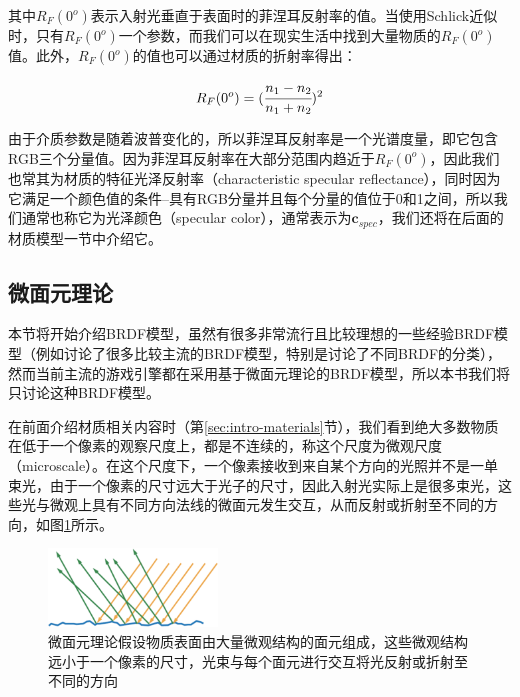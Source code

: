 其中$R_F(0^o)$表示入射光垂直于表面时的菲涅耳反射率的值。当使用Schlick近似时，只有$R_F(0^o)$一个参数，而我们可以在现实生活中找到大量物质的$R_F(0^o)$值。此外，$R_F(0^o)$的值也可以通过材质的折射率得出：

\begin{equation}
	R_F(0^o)=( \cfrac{n_1-n_2}{n_1+n_2})^2
\end{equation}

\noindent 由于介质参数是随着波普变化的，所以菲涅耳反射率是一个光谱度量，即它包含RGB三个分量值。因为菲涅耳反射率在大部分范围内趋近于$R_F(0^o)$，因此我们也常其为材质的特征光泽反射率（characteristic specular reflectance），同时因为它满足一个颜色值的条件--具有RGB分量并且每个分量的值位于0和1之间，所以我们通常也称它为光泽颜色（specular color），通常表示为$\mathbf{c}_{spec}$，我们还将在后面的材质模型一节中介绍它。




\subsection{微面元理论}
本节将开始介绍BRDF模型，虽然有很多非常流行且比较理想的一些经验BRDF模型（例如\cite{a:AComparisonofFourBRDFModels,a:ExperimentalAnalysisofBRDFModels,a:AnOverviewofBRDFModels}讨论了很多比较主流的BRDF模型，特别是\cite{a:AnOverviewofBRDFModels}讨论了不同BRDF的分类），然而当前主流的游戏引擎\cite{a:RealShadinginUnrealEngine4,a:MovingFrostbitetoPBR,a:PhysicallyBasedShadingatDisney,a:PhysicallyBasedShadinginUnity}都在采用基于微面元理论的BRDF模型，所以本书我们将只讨论这种BRDF模型。

在前面介绍材质相关内容时（第\ref{sec:intro-materials}节），我们看到绝大多数物质在低于一个像素的观察尺度上，都是不连续的，称这个尺度为微观尺度（microscale）。在这个尺度下，一个像素接收到来自某个方向的光照并不是一单束光，由于一个像素的尺寸远大于光子的尺寸，因此入射光实际上是很多束光，这些光与微观上具有不同方向法线的微面元发生交互，从而反射或折射至不同的方向，如图\ref{f:intro-microgeometry}所示。

\begin{figure}
	\sidecaption
	\includegraphics[width=0.4\textwidth]{figures/intro/ray-optics-3}
	\caption{微面元理论假设物质表面由大量微观结构的面元组成，这些微观结构远小于一个像素的尺寸，光束与每个面元进行交互将光反射或折射至不同的方向}
	\label{f:intro-microgeometry}
\end{figure}


